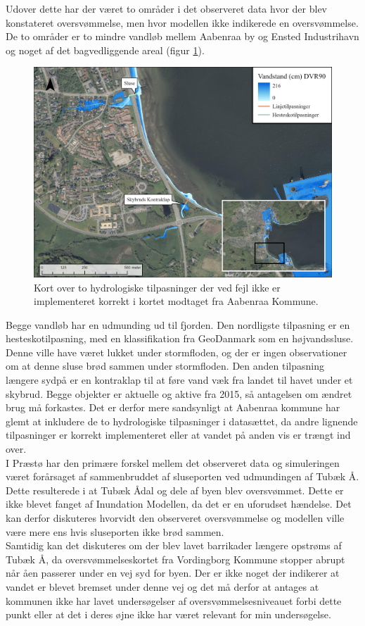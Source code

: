 Udover dette har der været to områder i det observeret data hvor der blev konstateret oversvømmelse, men hvor modellen ikke indikerede en oversvømmelse. De to områder er to mindre vandløb mellem Aabenraa by og Ensted Industrihavn og noget af det bagvedliggende areal (figur \ref{Figur: Tilpasnings fejl}). 
\begin{figure}[H]
    \centering
    \includegraphics[width=0.8\linewidth]{images/diskussion/tilpasnings_error.jpg}
    \caption{Kort over to hydrologiske tilpasninger der ved fejl ikke er implementeret korrekt i kortet modtaget fra Aabenraa Kommune.}
    \label{Figur: Tilpasnings fejl}
\end{figure}
Begge vandløb har en udmunding ud til fjorden. Den nordligste tilpasning er en hesteskotilpasning, med en klassifikation fra GeoDanmark som en højvandssluse. Denne ville have været lukket under stormfloden, og der er ingen observationer om at denne sluse brød sammen under stormfloden. Den anden tilpasning længere sydpå er en kontraklap til at føre vand væk fra landet til havet under et skybrud. Begge objekter er aktuelle og aktive fra 2015, så antagelsen om ændret brug må forkastes. Det er derfor mere sandsynligt at Aabenraa kommune har glemt at inkludere de to hydrologiske tilpasninger i datasættet, da andre lignende tilpasninger er korrekt implementeret eller at vandet på anden vis er trængt ind over. \\  

I Præstø har den primære forskel mellem det observeret data og simuleringen været forårsaget af sammenbruddet af sluseporten ved udmundingen af Tubæk Å. Dette resulterede i at Tubæk Ådal og dele af byen blev oversvømmet. Dette er ikke blevet fanget af Inundation Modellen, da det er en uforudset hændelse. Det kan derfor diskuteres hvorvidt den observeret oversvømmelse og modellen ville være mere ens hvis sluseporten ikke brød sammen.\\
Samtidig kan det diskuteres om der blev lavet barrikader længere opstrøms af Tubæk Å, da oversvømmelseskortet fra Vordingborg Kommune stopper abrupt når åen passerer under en vej syd for byen. Der er ikke noget der indikerer at vandet er blevet bremset under denne vej og det må derfor at antages at kommunen ikke har lavet undersøgelser af oversvømmelsesniveauet forbi dette punkt eller at det i deres øjne ikke har været relevant for min undersøgelse.\\

